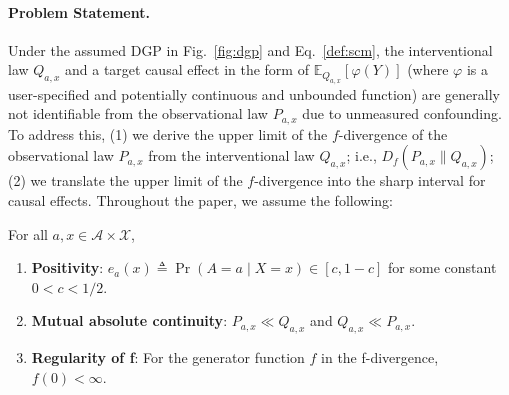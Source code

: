 \paragraph{Problem Statement.} 
Under the assumed DGP in Fig.~\ref{fig:dgp} and Eq.~\eqref{def:scm}, the interventional law $Q_{a,x}$ and a target causal effect in the form of $\mathbb{E}_{Q_{a,x}}[\varphi(Y)]$ (where $\varphi$ is a user-specified and potentially continuous and unbounded function) are generally not identifiable from the observational law $P_{a,x}$ due to unmeasured confounding. To address this, (1) we derive the upper limit of the $f$-divergence of the observational law $P_{a,x}$ from the interventional law $Q_{a,x}$; i.e., $D_{f}(P_{a,x} \| Q_{a,x})$; (2) we translate the upper limit of the $f$-divergence into the sharp interval for causal effects. Throughout the paper, we assume the following:
\begin{assumption}\label{assumption}
    \normalfont
    For all $a,x \in \mathcal{A} \times \mathcal{X}$, 
    \begin{enumerate}[leftmargin=*, itemsep=0pt]
        \item \textbf{Positivity}: $e_a(x) \triangleq \Pr(A=a \mid X=x) \in [c,1-c]$ for some constant $ 0< c  < 1/2$.
        \item \textbf{Mutual absolute continuity}: $P_{a,x} \ll Q_{a, x}$ and $Q_{a, x} \ll P_{a, x}$.
        \item \textbf{Regularity of f}: For the generator function $f$ in the f-divergence, $f(0) < \infty$.   
    \end{enumerate}
\end{assumption}